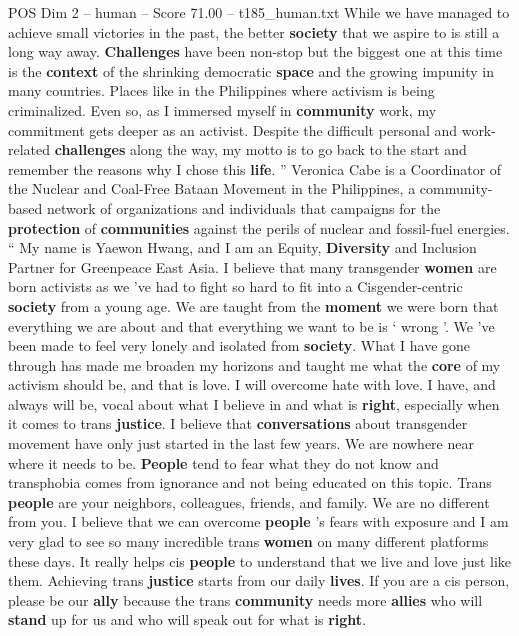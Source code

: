 \begin{textsample}{POS Dim 2 – human – Score 71.00 – t185\_human.txt}
While we have managed to achieve small victories in the past, the better \textbf{society} that we aspire to is still a long way away. \textbf{Challenges} have been non-stop but the biggest one at this time is the \textbf{context} of the shrinking democratic \textbf{space} and the growing impunity in many countries.
Places like in the Philippines where activism is being criminalized.
Even so, as I immersed myself in \textbf{community} work, my commitment gets deeper as an activist.
Despite the difficult personal and work-related \textbf{challenges} along the way, my motto is to go back to the start and remember the reasons why I chose this \textbf{life}. ” Veronica Cabe is a Coordinator of the Nuclear and Coal-Free Bataan Movement in the Philippines, a community-based network of organizations and individuals that campaigns for the \textbf{protection} of \textbf{communities} against the perils of nuclear and fossil-fuel energies. “ My name is Yaewon Hwang, and I am an Equity, \textbf{Diversity} and Inclusion Partner for Greenpeace East Asia.
I believe that many transgender \textbf{women} are born activists as we ’ve had to fight so hard to fit into a Cisgender-centric \textbf{society} from a young age.
We are taught from the \textbf{moment} we were born that everything we are about and that everything we want to be is ‘ wrong ’.
We ’ve been made to feel very lonely and isolated from \textbf{society}.
What I have gone through has made me broaden my horizons and taught me what the \textbf{core} of my activism should be, and that is love.
I will overcome hate with love.
I have, and always will be, vocal about what I believe in and what is \textbf{right}, especially when it comes to trans \textbf{justice}.
I believe that \textbf{conversations} about transgender movement have only just started in the last few years.
We are nowhere near where it needs to be. \textbf{People} tend to fear what they do not know and transphobia comes from ignorance and not being educated on this topic.
Trans \textbf{people} are your neighbors, colleagues, friends, and family.
We are no different from you.
I believe that we can overcome \textbf{people} ’s fears with exposure and I am very glad to see so many incredible trans \textbf{women} on many different platforms these days.
It really helps cis \textbf{people} to understand that we live and love just like them.
Achieving trans \textbf{justice} starts from our daily \textbf{lives}.
If you are a cis person, please be our \textbf{ally} because the trans \textbf{community} needs more \textbf{allies} who will \textbf{stand} up for us and who will speak out for what is \textbf{right}.

\end{textsample}
